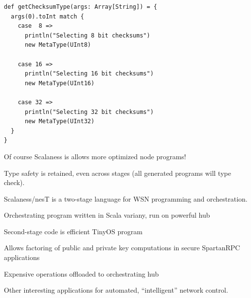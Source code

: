 \begin{lstlisting}[language=scalaness]
def getChecksumType(args: Array[String]) = {
  args(0).toInt match {
    case  8 => 
      println("Selecting 8 bit checksums")   
      new MetaType(UInt8)
        
    case 16 =>
      println("Selecting 16 bit checksums") 
      new MetaType(UInt16)

    case 32 =>
      println("Selecting 32 bit checksums")
      new MetaType(UInt32)
  }
}
\end{lstlisting}
\stopslide

\begin{citemize}
\item Of course Scalaness is allows more optimized node programs!
\item Type safety is retained, even across stages (all generated programs will type check).
\item {}
\end{citemize}
\stopslide


Scalaness/nesT is a two-stage language for WSN programming and orchestration.

\begin{citemize}
\item Orchestrating program written in Scala variany, run on powerful hub
\item Second-stage code is efficient TinyOS program
\item Allows factoring of public and private key computations in secure SpartanRPC 
applications
\begin{citemize}
\item Expensive operations offloaded to orchestrating hub
\end{citemize} 
\item Other interesting applications for automated, ``intelligent'' network 
control.
\end{citemize}

\stopslide
